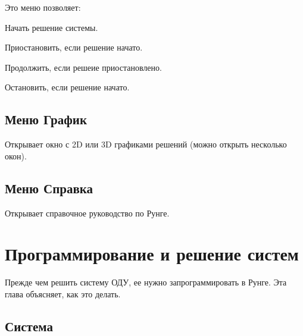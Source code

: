 \documentclass[12pt]{article}
\begin{document}

Это меню позволяет:
\begin{compactitem}
\item Начать решение системы.
\item Приостановить, если решение начато.
\item Продолжить, если решеие приостановлено.
\item Остановить, если решение начато.
\end{compactitem}


\subsection{Меню График}


Открывает окно с 2D или 3D графиками решений (можно открыть несколько окон).

\subsection{Меню Справка}

Открывает справочное руководство по Рунге.





\section{Программирование и решение систем}

Прежде чем решить систему ОДУ, ее нужно запрограммировать в Рунге.
Эта глава объясняет, как это делать.

\subsection{Система}
\end{document}
